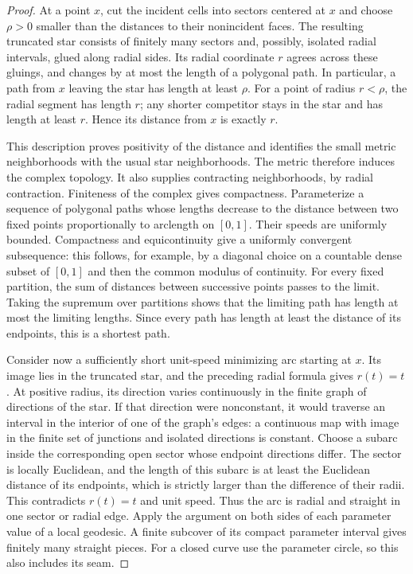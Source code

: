 \begin{proof}
At a point $x$, cut the incident cells into sectors centered at $x$ and
choose $\rho>0$ smaller than the distances to their nonincident faces.
The resulting truncated star consists of finitely many sectors and,
possibly, isolated radial intervals, glued along radial sides. Its radial
coordinate $r$ agrees across these gluings, and changes by at most the
length of a polygonal path. In particular, a path from $x$ leaving the
star has length at least $\rho$. For a point of radius $r<\rho$, the radial
segment has length $r$; any shorter competitor stays in the star and has
length at least $r$. Hence its distance from $x$ is exactly $r$.

This description proves positivity of the distance and identifies the
small metric neighborhoods with the usual star neighborhoods. The metric
therefore induces the complex topology. It also supplies contracting
neighborhoods, by radial contraction. Finiteness of the complex gives
compactness. Parameterize a sequence of polygonal paths whose lengths
decrease to the distance between two fixed points proportionally to
arclength on $[0,1]$. Their speeds are uniformly bounded. Compactness and
equicontinuity give a uniformly convergent subsequence: this follows, for
example, by a diagonal choice on a countable dense subset of $[0,1]$ and
then the common modulus of continuity. For every fixed partition, the
sum of distances between successive points passes to the limit. Taking
the supremum over partitions shows that the limiting path has length at
most the limiting lengths. Since every path has length at least the
distance of its endpoints, this is a shortest path.

Consider now a sufficiently short unit-speed minimizing arc starting at
$x$. Its image lies in the truncated star, and the preceding radial
formula gives $r(t)=t$. At positive radius, its direction varies
continuously in the finite graph of directions of the star. If that
direction were nonconstant, it would traverse an interval in the interior
of one of the graph's edges: a continuous map with image in the finite
set of junctions and isolated directions is constant. Choose a subarc
inside the corresponding open sector whose endpoint directions differ.
The sector is locally Euclidean, and the length of this subarc is at
least the Euclidean distance of its endpoints, which is strictly larger
than the difference of their radii. This contradicts $r(t)=t$ and
unit speed. Thus the arc is radial and straight in one sector or radial
edge. Apply the argument on both sides of each parameter value of a local
geodesic. A finite subcover of its compact parameter interval gives
finitely many straight pieces. For a closed curve use the parameter
circle, so this also includes its seam.


\end{proof}
